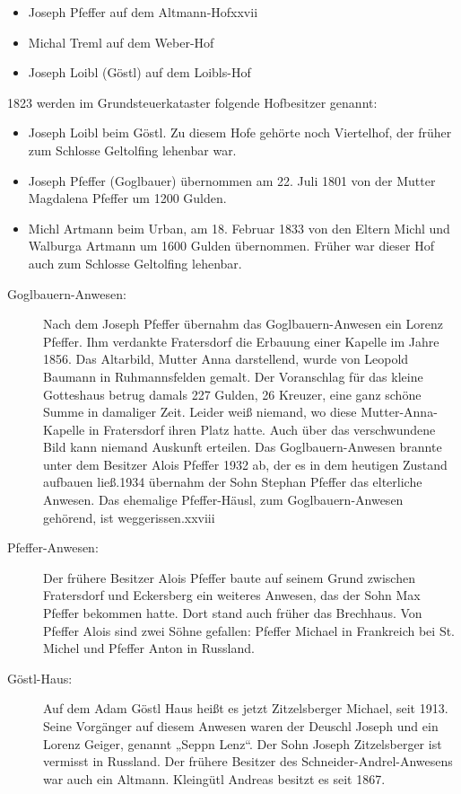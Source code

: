 \documentclass[12pt,a4pager]{book}
\begin{document}
\begin{itemize}
\item Joseph Pfeffer auf dem Altmann-Hofxxvii

\item Michal Treml auf dem Weber-Hof

\item Joseph Loibl (Göstl) auf dem Loibls-Hof
\end{itemize}

1823 werden im Grundsteuerkataster folgende Hofbesitzer genannt:

\begin{itemize}
\item Joseph Loibl beim Göstl. Zu diesem Hofe gehörte noch Viertelhof, der früher zum
Schlosse Geltolfing lehenbar war.

\item Joseph Pfeffer (Goglbauer) übernommen am 22. Juli 1801 von der Mutter Magdalena
Pfeffer um 1200 Gulden.

\item Michl Artmann beim Urban, am 18. Februar 1833 von den Eltern Michl und Walburga
Artmann um 1600 Gulden übernommen. Früher war dieser Hof auch zum Schlosse
Geltolfing lehenbar.
\end{itemize}

\begin{description}
\item[Goglbauern-Anwesen:] Nach dem Joseph Pfeffer übernahm das Goglbauern-Anwesen ein
Lorenz Pfeffer. Ihm verdankte Fratersdorf die Erbauung einer Kapelle im Jahre
1856. Das Altarbild, Mutter Anna darstellend, wurde von Leopold Baumann in
Ruhmannsfelden gemalt. Der Voranschlag für das kleine Gotteshaus betrug damals
227 Gulden, 26 Kreuzer, eine ganz schöne Summe in damaliger Zeit. Leider weiß
niemand, wo diese Mutter-Anna-Kapelle in Fratersdorf ihren Platz hatte. Auch
über das verschwundene Bild kann niemand Auskunft erteilen. Das
Goglbauern-Anwesen brannte unter dem Besitzer Alois Pfeffer 1932 ab, der es in
dem heutigen Zustand aufbauen ließ.1934 übernahm der Sohn Stephan Pfeffer das
elterliche Anwesen. Das ehemalige Pfeffer-Häusl, zum Goglbauern-Anwesen
gehörend, ist weggerissen.xxviii

\item[Pfeffer-Anwesen:] Der frühere Besitzer Alois Pfeffer baute auf seinem Grund
zwischen Fratersdorf und Eckersberg ein weiteres Anwesen, das der Sohn Max
Pfeffer bekommen hatte. Dort stand auch früher das Brechhaus. Von Pfeffer Alois
sind zwei Söhne gefallen: Pfeffer Michael in Frankreich bei St. Michel und
Pfeffer Anton in Russland.

\item[Göstl-Haus:] Auf dem Adam Göstl Haus heißt es jetzt Zitzelsberger Michael, seit
1913. Seine Vorgänger auf diesem Anwesen waren der Deuschl Joseph und ein Lorenz
Geiger, genannt „Seppn Lenz“. Der Sohn Joseph Zitzelsberger ist vermisst in
Russland. Der frühere Besitzer des Schneider-Andrel-Anwesens war auch ein
Altmann. Kleingütl Andreas besitzt es seit 1867.
\end{description}
\end{document}
